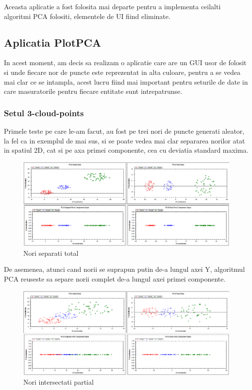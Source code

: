 \documentclass[12pt,oneside]{article}
\begin{document}
Aceasta aplicatie a fost folosita mai departe pentru a implementa ceilalti algoritmi PCA folositi, elementele de UI fiind eliminate.

\newpage
\subsection{Aplicatia PlotPCA}
In acest moment, am decis sa realizam o aplicatie care are un GUI usor de folosit si unde fiecare nor de puncte este reprezentat in alta culoare, pentru a se vedea mai clar ce se intampla, acest lucru fiind mai important pentru seturile de date in care masuratorile pentru fiecare entitate sunt intrepatrunse.

\subsubsection{Setul 3-cloud-points}
Primele teste pe care le-am facut, au fost pe trei nori de puncte generati aleator, la fel ca in exemplul de mai sus, si se poate vedea mai clar separarea norilor atat in spatiul 2D, cat si pe axa primei componente, cea cu deviatia standard maxima. \begin{figure}[H]
	\caption{Nori separati total}
	\centering
	\includegraphics[width=\linewidth]{threecloud1}
\end{figure}

De asemenea, atunci cand norii se suprapun putin de-a lungul axei Y, algoritmul PCA reuseste sa separe norii complet de-a lungul axei primei componente. 

\begin{figure}[H]
\caption{Nori intersectati partial}
\centering
\includegraphics[width=\linewidth]{threecloud2}
\end{figure}
\end{document}
